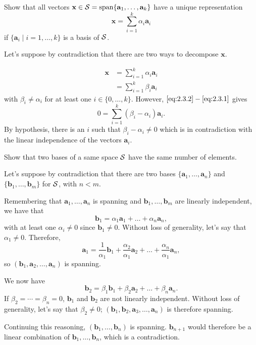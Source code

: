Show that all vectors \(\mathbf{x} \in \mathcal{S} = \mathop{\mathrm{span}}\{\mathbf{a}_1, \dots, \mathbf{a}_k\}\) have a unique representation
\[
\mathbf{x} = \sum_{i=1}^k \alpha_i \mathbf{a}_i
\]
if \(\{\mathbf{a}_i \mid i = 1, \dots, k\}\) is a basis of \(\mathcal{S}\).
\begin{solution}
  Let's suppose by contradiction that there are two ways
  to decompose $\mathbf{x}$.

  \begin{align}
    \label{eq:2.3.1}
    \mathbf{x} & = \sum_{i=1}^k \alpha_i \mathbf{a}_i\\
    \label{eq:2.3.2}
               & = \sum_{i=1}^k \beta_i \mathbf{a}_i
  \end{align}
  with $\beta_i \neq \alpha_i$ for at least one $i \in \{0, \ldots, k\}$.
  However, $\eqref{eq:2.3.2}-\eqref{eq:2.3.1}$ gives
  \[
    0 = \sum_{i=1}^k (\beta_i-\alpha_i) \mathbf{a}_i.
  \]
  By hypothesis, there is an $i$ such that $\beta_i-\alpha_i \neq 0$
  which is in contradiction with the linear independence of the vectors $\mathbf{a}_i$.
\end{solution}

Show that two bases of a same space \(\mathcal{S}\) have the same number of elements.
\begin{solution}
  Let's suppose by contradiction that there are two
  bases $\{\mathbf{a}_1, \ldots, \mathbf{a}_n\}$ and $\{\mathbf{b}_1, \ldots, \mathbf{b}_m\}$ for \(\mathcal{S}\), with $n < m$.

  Remembering that $\mathbf{a}_1, \ldots, \mathbf{a}_n$ is spanning
  and $\mathbf{b}_1, \ldots, \mathbf{b}_m$ are linearly independent, we have that
  \[ \mathbf{b}_1 = \alpha_1 \mathbf{a}_1 + \dots + \alpha_n \mathbf{a}_n,\]
  with at least one $\alpha_i \neq 0$ since $\mathbf{b}_1 \neq 0$.
  Without loss of generality, let's say that $\alpha_1 \neq 0$.
  Therefore,
  \[ \mathbf{a}_1 = \frac{1}{\alpha_1}\mathbf{b}_1 + \frac{\alpha_2}{\alpha_1} \mathbf{a}_2 + \dots + \frac{\alpha_n}{\alpha_1} \mathbf{a}_n,\]
  so $(\mathbf{b}_1, \mathbf{a}_2, \ldots, \mathbf{a}_n)$ is spanning.

  We now have
  \[ \mathbf{b}_2 = \beta_1 \mathbf{b}_1 + \beta_2 \mathbf{a}_2 + \dots + \beta_n \mathbf{a}_n.\]
  If $\beta_2 = \cdots = \beta_n = 0$, $\mathbf{b}_1$ and $\mathbf{b}_2$ are not linearly independent.
  Without loss of generality, let's say that $\beta_2 \neq 0$;
  $(\mathbf{b}_1,\mathbf{b}_2,\mathbf{a}_3,\ldots,\mathbf{a}_n)$ is therefore spanning.

  Continuing this reasoning, $(\mathbf{b}_1,\ldots,\mathbf{b}_n)$ is spanning.
  $\mathbf{b}_{n+1}$ would therefore be a linear combination of $\mathbf{b}_1, \ldots, \mathbf{b}_n$, which is a contradiction.
\end{solution}

